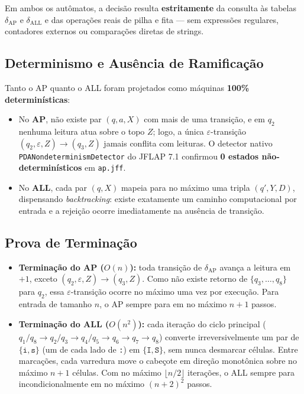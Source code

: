 Em ambos os autômatos, a decisão resulta \textbf{estritamente} da consulta às tabelas $\delta_{\text{AP}}$ e $\delta_{\text{ALL}}$ e das operações reais de pilha e fita --- sem expressões regulares, contadores externos ou comparações diretas de strings.

\subsection{Determinismo e Ausência de Ramificação}

Tanto o AP quanto o ALL foram projetados como máquinas \textbf{100\% determinísticas}:
\begin{itemize}
    \item No \textbf{AP}, não existe par $(q, a, X)$ com mais de uma transição, e em $q_2$ nenhuma leitura atua sobre o topo $Z$; logo, a única $\varepsilon$-transição $(q_2, \varepsilon, Z) \to (q_3, Z)$ jamais conflita com leituras. O detector nativo \texttt{PDANondeterminismDetector} do JFLAP 7.1 confirmou \textbf{0 estados não-determinísticos} em \texttt{ap.jff}.
    \item No \textbf{ALL}, cada par $(q, X)$ mapeia para no máximo uma tripla $(q', Y, D)$, dispensando \textit{backtracking}: existe exatamente um caminho computacional por entrada e a rejeição ocorre imediatamente na ausência de transição.
\end{itemize}

\subsection{Prova de Terminação}

\begin{itemize}
    \item \textbf{Terminação do AP ($O(n)$):} toda transição de $\delta_{\text{AP}}$ avança a leitura em $+1$, exceto $(q_2, \varepsilon, Z) \to (q_3, Z)$. Como não existe retorno de $\{q_3, \dots, q_8\}$ para $q_2$, essa $\varepsilon$-transição ocorre no máximo uma vez por execução. Para entrada de tamanho $n$, o AP sempre para em no máximo $n + 1$ passos.
    \item \textbf{Terminação do ALL ($O(n^2)$):} cada iteração do ciclo principal ($q_1/q_8 \to q_2/q_3 \to q_4/q_5 \to q_6 \to q_7 \to q_8$) converte irreversivelmente um par de $\{\texttt{i}, \texttt{s}\}$ (um de cada lado de \texttt{:}) em $\{\texttt{I}, \texttt{S}\}$, sem nunca desmarcar células. Entre marcações, cada varredura move o cabeçote em direção monotônica sobre no máximo $n + 1$ células. Com no máximo $\lfloor n/2 \rfloor$ iterações, o ALL sempre para incondicionalmente em no máximo $(n+2)^2$ passos.
\end{itemize}
